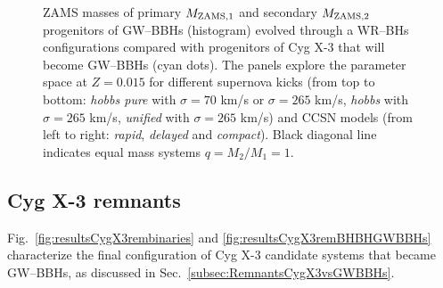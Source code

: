 \documentclass[a4paper,titlepage]{book}     	%
\begin{document}
\begin{appendices}
\begin{figure}
	\caption{ZAMS masses of primary $M_{\rm ZAMS,1}$ and secondary $M_{\rm ZAMS,2}$ progenitors of GW--BBHs (histogram) evolved through a WR--BHs configurations compared with progenitors of Cyg X-3 that will become GW--BBHs (cyan dots). The panels explore the parameter space at $Z=0.015$ for different supernova kicks (from top to bottom: \emph{hobbs pure} with $\sigma = 70$ km/s or $\sigma = 265$ km/s, \emph{hobbs} with $\sigma = 265$ km/s, \emph{unified} with $\sigma = 265$ km/s) and CCSN models (from left to right: \emph{rapid}, \emph{delayed} and \emph{compact}). Black diagonal line indicates equal mass systems $q=M_2/M_1 = 1$.}\label{fig:resultsCygX3progM1M2GWBBHs}
\end{figure}






\subsection{Cyg X-3 remnants}\label{appsubsec:RemnantsCygX3vsGWBBHs}
Fig.\ \ref{fig:resultsCygX3rembinaries} and \ref{fig:resultsCygX3remBHBHGWBBHs} characterize the final configuration of Cyg X-3 candidate systems that became GW--BBHs, as discussed in Sec.\ \ref{subsec:RemnantsCygX3vsGWBBHs}.



\end{appendices}
\end{document}
